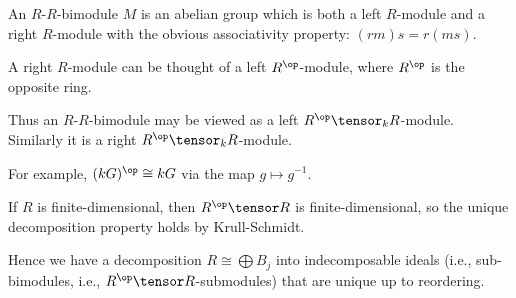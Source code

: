 An $R$-$R$-bimodule $M$ is an abelian group which is both a left $R$-module and
a right $R$-module with the obvious associativity property: $(rm)s = r(ms)$.

A right $R$-module can be thought of a left $R^\op$-module, where $R^\op$ is
the opposite ring.

Thus an $R$-$R$-bimodule may be viewed as a left $R^\op\tensor_k R$-module.
Similarly it is a right $R^\op\tensor_k R$-module.

For example, $(kG)^\op\cong kG$ via the map $g\mapsto g^{-1}$.

If $R$ is finite-dimensional, then $R^\op\tensor R$ is finite-dimensional, so the
unique decomposition property holds by Krull-Schmidt.

Hence we have a decomposition  $R\cong \bigoplus B_j$ into indecomposable ideals
(i.e., sub-bimodules, i.e., $R^\op\tensor R$-submodules)
that are unique up to reordering.
